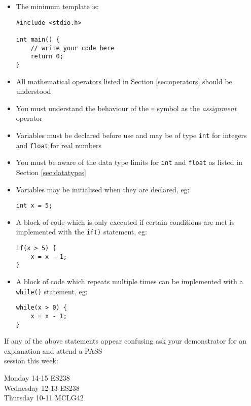 \documentclass{lab}
\begin{document}
\begin{itemize}
\item The minimum template is:
\begin{lstlisting}[style=CStyle]
#include <stdio.h>

int main() {
	// write your code here
	return 0;
}
\end{lstlisting}
\item All mathematical operators listed in Section \ref{sec:operators} should be understood
\item You must understand the behaviour of the \texttt{=} symbol as the \textit{assignment} operator
\item Variables must be declared before use and may be of type \texttt{int} for integers and \texttt{float} for real numbers
\item You must be aware of the data type limits for \texttt{int} and \texttt{float} as listed in Section \ref{sec:datatypes}
\item Variables may be initialised when they are declared, eg:
\begin{lstlisting}[style=CStyle]
int x = 5;
\end{lstlisting}
\item A block of code which is only executed if certain conditions are met is implemented with the \texttt{if()} statement, eg:
\begin{lstlisting}[style=CStyle]
if(x > 5) {
	x = x - 1;
}
\end{lstlisting}
\item A block of code which repeats multiple times can be implemented with a \texttt{while()} statement, eg:
\begin{lstlisting}[style=CStyle]
while(x > 0) {
	x = x - 1;
}
\end{lstlisting}

\end{itemize}

{\huge If any of the above statements appear confusing ask your demonstrator for an explanation and attend a PASS\\session this week: \\
\begin{center}
Monday 14-15 ES238 \\
Wednesday 12-13 ES238\\
Thursday 10-11 MCLG42
\end{center}}
\end{document}
